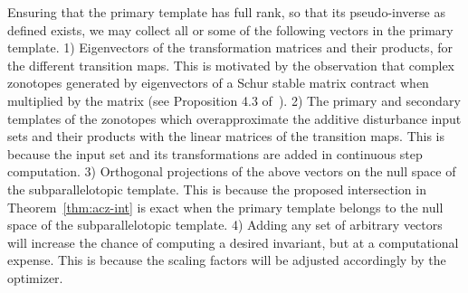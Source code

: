   Ensuring that the primary
template has full rank, so that its pseudo-inverse as defined exists,
we may collect all or some of the following vectors in the primary
template.
%
1) Eigenvectors of the transformation matrices and their products, for
   the different transition maps.  This is motivated by the
   observation that complex zonotopes generated by eigenvectors of a
   Schur stable matrix contract when multiplied by the matrix (see
   Proposition 4.3 of~\cite{adimoolamACC2016}).  2) The primary and
   secondary templates of the zonotopes which overapproximate the
   additive disturbance input sets and their products with the linear
   matrices of the transition maps.  This is because the input set and
   its transformations are added in continuous step computation.  3)
   Orthogonal projections of the above vectors on the null space of
   the subparallelotopic template.  This is because the proposed
   intersection in Theorem~\ref{thm:acz-int} is exact when the primary
   template belongs to the null space of the subparallelotopic
   template.  4) Adding any set of arbitrary vectors will increase the
   chance of computing a desired invariant, but at a computational
   expense.  This is because the scaling factors will be adjusted
   accordingly by the optimizer.
